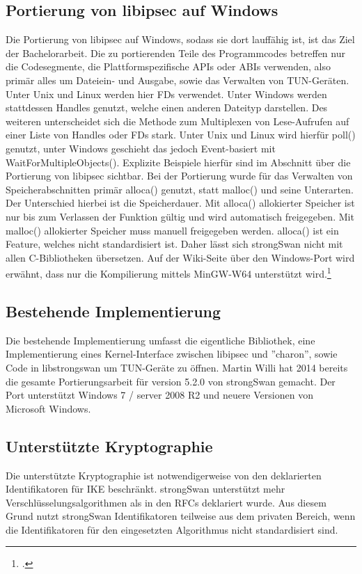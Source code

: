 \subsection{Portierung von libipsec auf Windows}
Die Portierung von libipsec auf Windows, sodass sie dort lauffähig ist, ist das Ziel
der Bachelorarbeit. Die zu portierenden Teile des Programmcodes betreffen nur
die Codesegmente, die Plattformspezifische \acp{API} oder \acp{ABI} verwenden,
also primär alles um Dateiein- und Ausgabe, sowie das Verwalten von TUN-Geräten.
Unter Unix und Linux werden hier \acp{FD} verwendet. Unter Windows werden stattdessen
Handles genutzt, welche einen anderen Dateityp darstellen. Des weiteren unterscheidet
sich die Methode zum Multiplexen von Lese-Aufrufen auf einer Liste von Handles oder \acp{FD} stark.
Unter Unix und Linux wird hierfür poll() genutzt, unter Windows geschieht das jedoch
Event-basiert mit WaitForMultipleObjects().
Explizite Beispiele hierfür sind im Abschnitt über die Portierung von libipsec sichtbar.
Bei der Portierung wurde für das Verwalten von Speicherabschnitten 
primär alloca() genutzt, statt malloc() und seine Unterarten. Der Unterschied hierbei ist die
Speicherdauer. Mit alloca() allokierter Speicher ist nur bis zum Verlassen der Funktion gültig
und wird automatisch freigegeben. Mit malloc() allokierter Speicher muss manuell freigegeben werden.
alloca() ist ein Feature, welches nicht standardisiert ist.
Daher lässt sich strongSwan nicht mit allen C-Bibliotheken übersetzen.
Auf der Wiki-Seite über den Windows-Port wird erwähnt, dass nur die Kompilierung
mittels MinGW-W64 unterstützt wird.\footcite[][]{_windows_2015}


\subsection{Bestehende Implementierung}
Die bestehende Implementierung umfasst die eigentliche Bibliothek, eine Implementierung
eines Kernel-Interface zwischen libipsec und ''charon'', sowie Code in libstrongswan
um TUN-Geräte zu öffnen. Martin Willi hat 2014 bereits die gesamte Portierungsarbeit
für version 5.2.0 von strongSwan gemacht. Der Port unterstützt Windows 7 / server 2008 R2
und neuere Versionen von Microsoft Windows.

\subsection{Unterstützte Kryptographie}
Die unterstützte Kryptographie ist notwendigerweise von den deklarierten Identifikatoren
für IKE beschränkt. strongSwan unterstützt mehr Verschlüsselungsalgorithmen als
in den \acp{RFC} deklariert wurde. Aus diesem Grund nutzt strongSwan Identifikatoren
teilweise aus dem privaten Bereich, wenn die Identifikatoren für den eingesetzten Algorithmus
nicht standardisiert sind.

